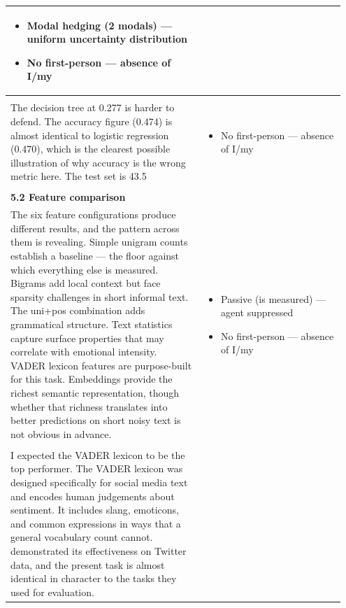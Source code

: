 \documentclass[11pt]{article}
\begin{document}
\begin{longtable}{|p{0.55\linewidth}|p{0.40\linewidth}|}
\begin{itemize}[leftmargin=1em,itemsep=1pt,topsep=1pt,parsep=0pt]
  \item Modal hedging (2 modals) --- uniform uncertainty distribution
  \item No first-person --- absence of I/my
\end{itemize} \\[2pt]
\hline
\rule{0pt}{3.5cm} & \\
\hline
The decision tree at 0.277 is harder to defend. The accuracy figure (0.474) is almost identical to logistic regression (0.470), which is the clearest possible illustration of why accuracy is the wrong metric here. The test set is 43.5 & \begin{itemize}[leftmargin=1em,itemsep=1pt,topsep=1pt,parsep=0pt]
  \item No first-person --- absence of I/my
\end{itemize} \\[2pt]
\hline
\rule{0pt}{3.5cm} & \\
\hline
\textbf{5.2 Feature comparison}\\[4pt]
The six feature configurations produce different results, and the pattern across them is revealing. Simple unigram counts establish a baseline --- the floor against which everything else is measured. Bigrams add local context but face sparsity challenges in short informal text. The uni+pos combination adds grammatical structure. Text statistics capture surface properties that may correlate with emotional intensity. VADER lexicon features are purpose-built for this task. Embeddings provide the richest semantic representation, though whether that richness translates into better predictions on short noisy text is not obvious in advance. & \begin{itemize}[leftmargin=1em,itemsep=1pt,topsep=1pt,parsep=0pt]
  \item Passive (is measured) --- agent suppressed
  \item No first-person --- absence of I/my
\end{itemize} \\[2pt]
\hline
\rule{0pt}{3.5cm} & \\
\hline
I expected the VADER lexicon to be the top performer. The VADER lexicon was designed specifically for social media text and encodes human judgements about sentiment. It includes slang, emoticons, and common expressions in ways that a general vocabulary count cannot. demonstrated its effectiveness on Twitter data, and the present task is almost identical in character to the tasks they used for evaluation. & \begin{itemize}[leftmargin=1em,itemsep=1pt,topsep=1pt,parsep=0pt]

\end{itemize}
\end{longtable}
\end{document}
